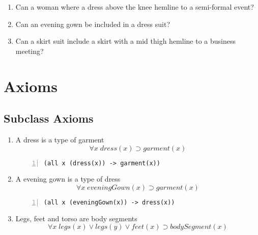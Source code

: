 \documentclass[paper=a4, fontsize=11pt]{scrartcl} %
\numberwithin{equation}{section} %
\numberwithin{figure}{section} %
\numberwithin{table}{section} %
\begin{document}
\begin{enumerate}
	
	\item Can a woman where a dress above the knee hemline to a semi-formal event?


	\item Can an evening gown be included in a dress suit?


	\item Can a skirt suit include a skirt with a mid thigh hemline to a business meeting?

	
\end{enumerate}
\clearpage

\section{Axioms}
\subsection{Subclass Axioms}
\begin{enumerate}

	\item A dress is a type of garment
	\begin{equation*}
		\forall x \; dress(x) \supset garment(x)
	\end{equation*}
	\begin{Verbatim}[frame=lines,gobble=2,numbers=left]
		(all x (dress(x)) -> garment(x))
	\end{Verbatim}
	

	\item A evening gown is a type of dress
	\begin{equation*}
		\forall x \; eveningGown(x) \supset garment(x)
	\end{equation*}
	\begin{Verbatim}[frame=lines,gobble=2,numbers=left]
		(all x (eveningGown(x)) -> dress(x))
	\end{Verbatim}


\item Legs, feet and torso are body segments
\begin{equation*}
	\forall x \; legs(x) \lor legs(y) \lor feet(x) \supset bodySegment(x)
\end{equation*}

\end{enumerate}
\clearpage
\end{document}
